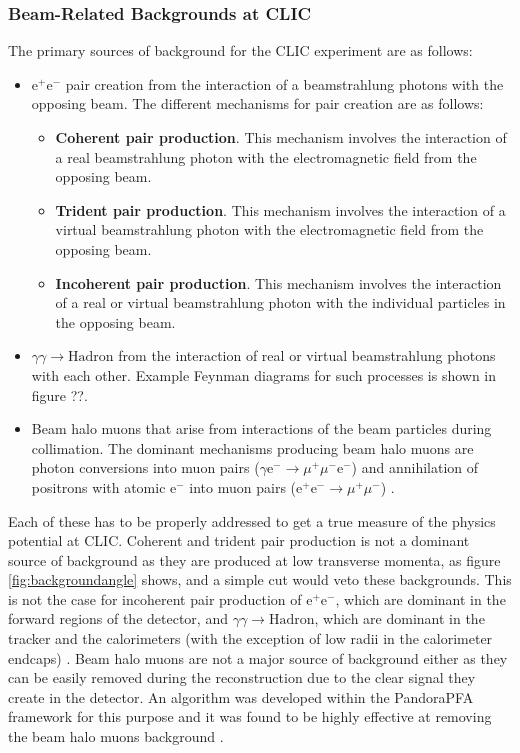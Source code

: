 \subsubsection{Beam-Related Backgrounds at CLIC}
The primary sources of background for the CLIC experiment are as follows:
\begin{itemize}
\item $\text{e}^{+}\text{e}^{-}$ pair creation from the interaction of a beamstrahlung photons with the opposing beam.  The different mechanisms for pair creation are as follows:
\begin{itemize}
\item \textbf{Coherent pair production}.  This mechanism involves the interaction of a real beamstrahlung photon with the electromagnetic field from the opposing beam.
\item \textbf{Trident pair production}.  This mechanism involves the interaction of a virtual beamstrahlung photon with the electromagnetic field from the opposing beam.
\item \textbf{Incoherent pair production}.  This mechanism involves the interaction of a real or virtual beamstrahlung photon with the individual particles in the opposing beam.
\end{itemize}
\item $\gamma\gamma \rightarrow \text{Hadron}$ from the interaction of real or virtual beamstrahlung photons with each other.  Example Feynman diagrams for such processes is shown in figure ??. 
\item Beam halo muons that arise from interactions of the beam particles during collimation.  The dominant mechanisms producing beam halo muons are photon conversions into muon pairs ($\gamma \text{e}^{-} \rightarrow \mu^{+}\mu^{-}\text{e}^{-}$) and annihilation of positrons with atomic $\text{e}^{-}$ into muon pairs ($\text{e}^{+}\text{e}^{-} \rightarrow \mu^{+}\mu^{-}$) \cite{Pilicer:2015ijy}.
\end{itemize}

Each of these has to be properly addressed to get a true measure of the physics potential at CLIC.  Coherent and trident pair production is not a dominant source of background as they are produced at low transverse momenta, as figure \ref{fig:backgroundangle} shows, and a simple cut would veto these backgrounds.  This is not the case for incoherent pair production of $\text{e}^{+}\text{e}^{-}$, which are dominant in the forward regions of the detector, and $\gamma\gamma \rightarrow \text{Hadron}$, which are dominant in the tracker and the calorimeters (with the exception of low radii in the calorimeter endcaps) \cite{Linssen:2012hp, Sailer:2012mfa}.  Beam halo muons are not a major source of background either as they can be easily removed during the reconstruction due to the clear signal they create in the detector.  An algorithm was developed within the PandoraPFA framework for this purpose and it was found to be highly effective at removing the beam halo muons background \cite{Linssen:2012hp}.  


